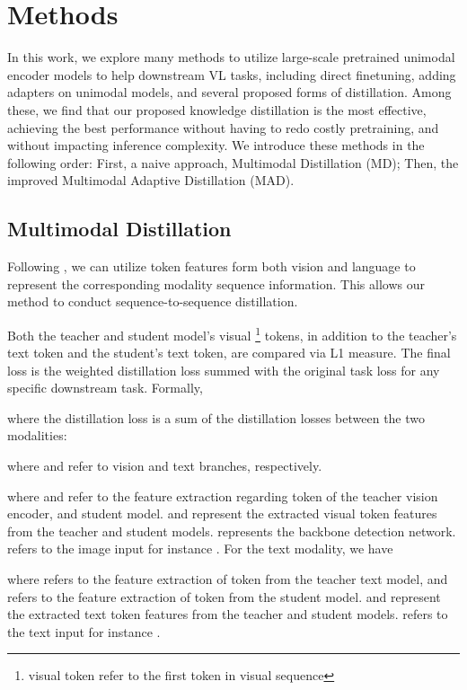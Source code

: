 \documentclass[runningheads]{llncs}
\begin{document}
\section{Methods}
In this work, we explore many methods to utilize large-scale pretrained unimodal encoder models to help downstream VL tasks, including direct finetuning, adding adapters on unimodal models, and several proposed forms of distillation. Among these, we find that our proposed knowledge distillation is the most effective, achieving the best performance without having to redo costly pretraining, and without impacting inference complexity. We introduce these methods in the following order: First, a naive approach, Multimodal Distillation (MD); Then, the improved Multimodal Adaptive Distillation (MAD).


\subsection{Multimodal Distillation}
Following \cite{sanh2019distilbert,jiao2019tinybert,kim2016sequence,sun2019patient}, we can utilize token features form both vision and language to represent the corresponding modality sequence information. This allows our method to conduct sequence-to-sequence distillation.

Both the teacher and student model's visual \footnote{visual  token refer to the first token in visual sequence} tokens, in addition to the teacher's text  token and the student's text  token, are compared via L1 measure. The final loss is the weighted distillation loss  summed with the original task loss  for any specific downstream task. Formally,



\noindent where the distillation loss  is a  sum of the distillation losses between the two modalities:



\noindent where  and  refer to vision and text branches, respectively.


\noindent where  and  refer to the feature extraction regarding  token of the teacher vision encoder, and student model.  and  represent the extracted visual token features from the teacher and student models.  represents the backbone detection network.  refers to the image input for instance . For the text modality, we have



\noindent where  refers to the feature extraction of  token from the teacher text model, and  refers to the feature extraction of  token from the student model.  and  represent the extracted text token features from the teacher and student models.  refers to the text input for instance .
\end{document}
